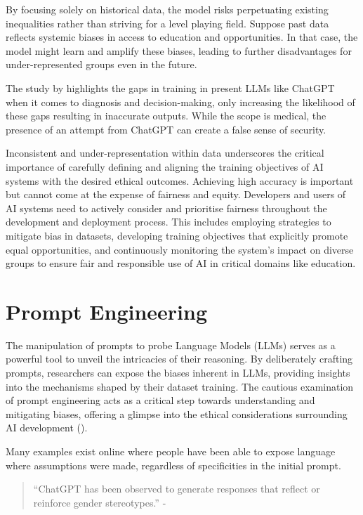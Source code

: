 \documentclass[12pt]{article}
\begin{document}
By focusing solely on historical data, the model risks perpetuating existing inequalities rather than striving for a level playing field. Suppose past data reflects systemic biases in access to education and opportunities. In that case, the model might learn and amplify these biases, leading to further disadvantages for under-represented groups even in the future.

The study by \cite{ullah-2024} highlights the gaps in training in present LLMs like ChatGPT when it comes to diagnosis and decision-making, only increasing the likelihood of these gaps resulting in inaccurate outputs. While the scope is medical, the presence of an attempt from ChatGPT can create a false sense of security. 
    
Inconsistent and under-representation within data underscores the critical importance of carefully defining and aligning the training objectives of AI systems with the desired ethical outcomes. Achieving high accuracy is important but cannot come at the expense of fairness and equity. Developers and users of AI systems need to actively consider and prioritise fairness throughout the development and deployment process. This includes employing strategies to mitigate bias in datasets, developing training objectives that explicitly promote equal opportunities, and continuously monitoring the system's impact on diverse groups to ensure fair and responsible use of AI in critical domains like education.

\newpage

\section{Prompt Engineering}

The manipulation of prompts to probe Language Models (LLMs) serves as a powerful tool to unveil the intricacies of their reasoning. By deliberately crafting prompts, researchers can expose the biases inherent in LLMs, providing insights into the mechanisms shaped by their dataset training. The cautious examination of prompt engineering acts as a critical step towards understanding and mitigating biases, offering a glimpse into the ethical considerations surrounding AI development (\cite{liu-2023-ignoring-context}). 

Many examples exist online where people have been able to expose language where assumptions were made, regardless of specificities in the initial prompt.

\begin{quote}
    “ChatGPT has been observed to generate responses that reflect or reinforce gender stereotypes.” - \cite{green-2023}
\end{quote} 
\end{document}
